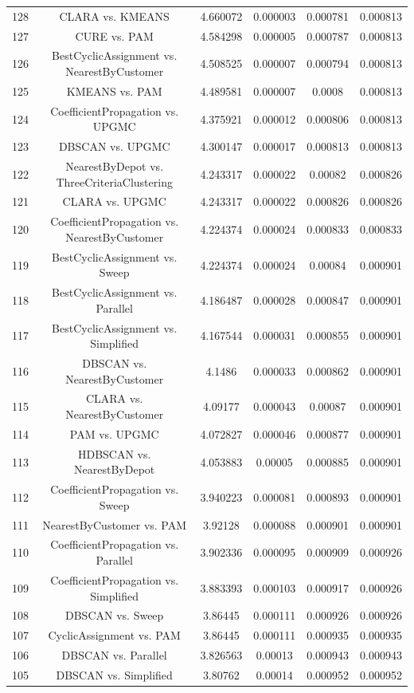 \documentclass[a4paper,10pt]{article}
\begin{document}
\begin{landscape}
\begin{table}[!htp]
\begin{tabular}{cccccc}
128&CLARA vs. KMEANS&4.660072&0.000003&0.000781&0.000813\\
127&CURE vs. PAM&4.584298&0.000005&0.000787&0.000813\\
126&BestCyclicAssignment vs. NearestByCustomer&4.508525&0.000007&0.000794&0.000813\\
125&KMEANS vs. PAM&4.489581&0.000007&0.0008&0.000813\\
124&CoefficientPropagation vs. UPGMC&4.375921&0.000012&0.000806&0.000813\\
123&DBSCAN vs. UPGMC&4.300147&0.000017&0.000813&0.000813\\
122&NearestByDepot vs. ThreeCriteriaClustering&4.243317&0.000022&0.00082&0.000826\\
121&CLARA vs. UPGMC&4.243317&0.000022&0.000826&0.000826\\
120&CoefficientPropagation vs. NearestByCustomer&4.224374&0.000024&0.000833&0.000833\\
119&BestCyclicAssignment vs. Sweep&4.224374&0.000024&0.00084&0.000901\\
118&BestCyclicAssignment vs. Parallel&4.186487&0.000028&0.000847&0.000901\\
117&BestCyclicAssignment vs. Simplified&4.167544&0.000031&0.000855&0.000901\\
116&DBSCAN vs. NearestByCustomer&4.1486&0.000033&0.000862&0.000901\\
115&CLARA vs. NearestByCustomer&4.09177&0.000043&0.00087&0.000901\\
114&PAM vs. UPGMC&4.072827&0.000046&0.000877&0.000901\\
113&HDBSCAN vs. NearestByDepot&4.053883&0.00005&0.000885&0.000901\\
112&CoefficientPropagation vs. Sweep&3.940223&0.000081&0.000893&0.000901\\
111&NearestByCustomer vs. PAM&3.92128&0.000088&0.000901&0.000901\\
110&CoefficientPropagation vs. Parallel&3.902336&0.000095&0.000909&0.000926\\
109&CoefficientPropagation vs. Simplified&3.883393&0.000103&0.000917&0.000926\\
108&DBSCAN vs. Sweep&3.86445&0.000111&0.000926&0.000926\\
107&CyclicAssignment vs. PAM&3.86445&0.000111&0.000935&0.000935\\
106&DBSCAN vs. Parallel&3.826563&0.00013&0.000943&0.000943\\
105&DBSCAN vs. Simplified&3.80762&0.00014&0.000952&0.000952\\

\end{tabular}
\end{table}
\end{landscape}
\end{document}
